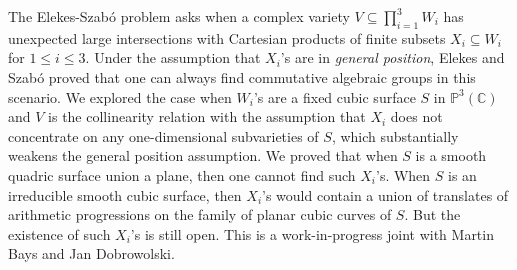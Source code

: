 \documentclass[bsl,meeting]{asl}
\def\urladdr#1{\endgraf\noindent{\it URL Address}: {\tt #1}.}
\newcommand{\NP}{}
\begin{document}
\thispagestyle{empty}


\NP%
%
%
%
%

The Elekes-Szab\'{o} problem asks when a complex variety $V\subseteq \prod_{i=1}^{3}W_i$ has unexpected large intersections with Cartesian products of finite subsets $X_i\subseteq W_i$ for $1\leq i\leq 3$. Under the assumption that $X_i$'s are in \emph{general position},  Elekes and Szab\'{o} proved that one can always find commutative algebraic groups in this scenario. 
We explored the case when $W_i$'s are a fixed cubic surface $S$ in $\mathbb{P}^3(\mathbb{C})$ and $V$ is the collinearity relation with the assumption that $X_i$ does not concentrate on any one-dimensional subvarieties of $S$, which substantially weakens the general position assumption. We proved that when $S$ is a smooth quadric surface union a plane, then one cannot find such $X_i$'s. When $S$ is an irreducible smooth cubic surface, then $X_i$'s would contain a union of translates of arithmetic progressions on the family of planar cubic curves of $S$. But the existence of such $X_i$'s is still open. This is a work-in-progress joint with Martin Bays and Jan Dobrowolski. 
\end{document}
